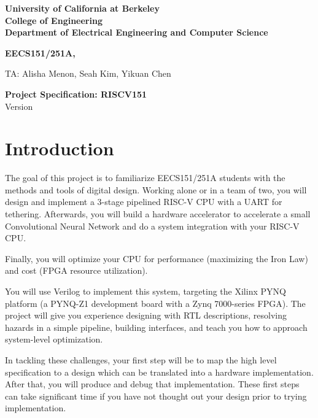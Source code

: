 \documentclass[11pt]{article}
\begin{document}
\begin{center}
{\bf
University of California at Berkeley \\
College of Engineering \\
Department of Electrical Engineering and Computer Science \\
}
\end{center}

\begin{center}
\LARGE{
\bf EECS151/251A, \currentSemester}
\end{center}
\begin{center}
TA: Alisha Menon, Seah Kim, Yikuan Chen
\end{center}

\begin{center}
\LARGE
{\bf Project Specification: RISCV151 }  \\
Version \projectSpecVersion
\end{center}

\tableofcontents

\newpage

\section{Introduction}
The goal of this project is to familiarize EECS151/251A students with the methods and tools of digital design.
Working alone or in a team of two, you will design and implement a 3-stage pipelined RISC-V CPU with a UART for tethering.
Afterwards, you will build a hardware accelerator to accelerate a small Convolutional Neural Network and do a system integration with your RISC-V CPU.

Finally, you will optimize your CPU for performance (maximizing the Iron Law) and cost (FPGA resource utilization).

You will use Verilog to implement this system, targeting the Xilinx PYNQ platform (a PYNQ-Z1 development board with a Zynq 7000-series FPGA).
The project will give you experience designing with RTL descriptions, resolving hazards in a simple pipeline, building interfaces, and teach you how to approach system-level optimization.

In tackling these challenges, your first step will be to map the high level specification to a design which can be translated into a hardware implementation.
After that, you will produce and debug that implementation.
These first steps can take significant time if you have not thought out your design prior to trying implementation.
\end{document}
